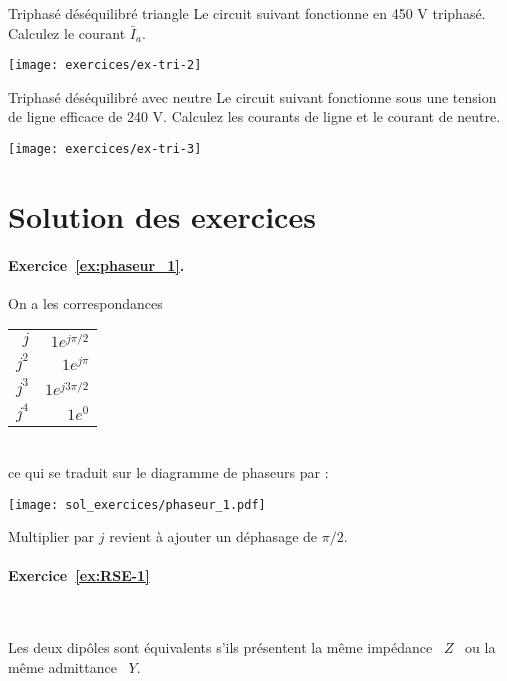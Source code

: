 \begin{exercise}{Triphasé déséquilibré triangle}
	\label{ex:tri-2} 
	Le circuit suivant fonctionne en 450 V triphasé. Calculez le courant $\bar{I}_a$.
	\begin{center}
		\texttt{[image: exercices/ex-tri-2]}
	\end{center}
	
\end{exercise}

\begin{exercise}{Triphasé déséquilibré avec neutre}
	\label{ex:tri-3} 
	Le circuit suivant fonctionne sous une tension de ligne efficace de 240 V. Calculez les courants de ligne et le courant de neutre.
	\begin{center}
		\texttt{[image: exercices/ex-tri-3]}
	\end{center}
\end{exercise}

\section{Solution des exercices}
\paragraph{Exercice~\ref{ex:phaseur_1}.} On a les correspondances \\
\begin{tabular}{r r}
	$j$ & $1 e^{j\pi/2}$\\
	$j^2$ & $1 e^{j\pi}$\\
	$j^3$ & $1 e^{j3\pi/2}$\\
	$j^4$ & $1 e^0$
\end{tabular}\\
ce qui se traduit sur le diagramme de phaseurs par : 
\begin{center}
	\texttt{[image: sol\_exercices/phaseur\_1.pdf]}
\end{center}
Multiplier par $j$ revient à ajouter un déphasage de $\pi/2$.

\paragraph{Exercice~\ref{ex:RSE-1}}~\\%

Les deux dip\^{o}les sont équivalents s'ils présentent la m\^{e}me
impédance \ $Z$ \ ou la m\^{e}me admittance \ $Y$.

